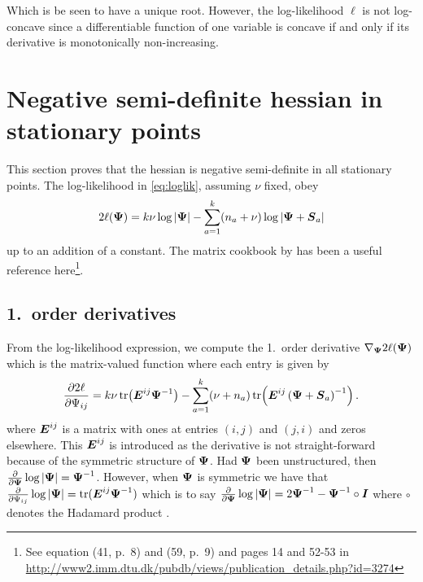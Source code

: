 \documentclass{article}\usepackage[]{graphicx}\usepackage[]{color}
\begin{document}
Which is be seen to have a unique root.
However, the log-likelihood $\ell$ is not log-concave since a differentiable function of one variable is concave if and only if its derivative is monotonically non-increasing.




\section{Negative semi-definite hessian in stationary points}
\label{sec:negativedefinite}
This section proves that the hessian is negative semi-definite in all stationary points.
The log-likelihood in \eqref{eq:loglik}, assuming $\nu$ fixed, obey
\begin{align}
  2\ell({\boldsymbol{\Psi}})
  = k\nu\log|{\boldsymbol{\Psi}}| - \sum_{a=1}^k (n_a + \nu)\log|{\boldsymbol{\Psi}} + {\boldsymbol{S}}_a|
\label{eq:loglik2}
\end{align}
up to an addition of a constant. The matrix cookbook by \citet{Petersen2008} has been a useful reference here\footnote{See equation (41, p.\ 8) and (59, p.\ 9) and pages 14 and 52-53 in \url{http://www2.imm.dtu.dk/pubdb/views/publication_details.php?id=3274}}.



\subsection{1.\ order derivatives}
From the log-likelihood expression, we compute the 1.\ order derivative $\nabla_{\boldsymbol{\Psi}} 2\ell({\boldsymbol{\Psi}})$ which is the matrix-valued function where each entry is given by
\begin{align}
  \frac{\partial 2\ell}{\partial \Psi_{ij}}
  = k\nu\operatorname*{tr}\!\left({\boldsymbol{E}}^{ij}{\boldsymbol{\Psi}}^{-1}\right)
    - \sum_{a = 1}^k (\nu + n_a)\operatorname*{tr}\!\left({\boldsymbol{E}}^{ij}\left({\boldsymbol{\Psi}} + {\boldsymbol{S}}_a\right)^{-1}\right).
\label{eq:dloglik}
\end{align}
where ${\boldsymbol{E}}^{ij}$ is a matrix with ones at entries $(i,j)$ and $(j,i)$ and zeros elsewhere.
This ${\boldsymbol{E}}^{ij}$ is introduced as the derivative is not straight-forward because of the symmetric structure of ${\boldsymbol{\Psi}}$. Had ${\boldsymbol{\Psi}}$ been unstructured, then $\frac{\partial}{\partial {\boldsymbol{\Psi}}}\log|{\boldsymbol{\Psi}}| = {\boldsymbol{\Psi}}^{-1}$.
However, when ${\boldsymbol{\Psi}}$ is symmetric we have that $\frac{\partial}{\partial \Psi_{ij}}\log|{\boldsymbol{\Psi}}| = \operatorname*{tr}({\boldsymbol{E}}^{ij}{\boldsymbol{\Psi}}^{-1})$ which is to say $\frac{\partial}{\partial {\boldsymbol{\Psi}}}\log|{\boldsymbol{\Psi}}| = 2{\boldsymbol{\Psi}}^{-1} -{\boldsymbol{\Psi}}^{-1} \circ {\boldsymbol{I}}$ where $\circ$ denotes the Hadamard product \citep[eq.\ (43) and (141)]{Petersen2008}.
\end{document}
